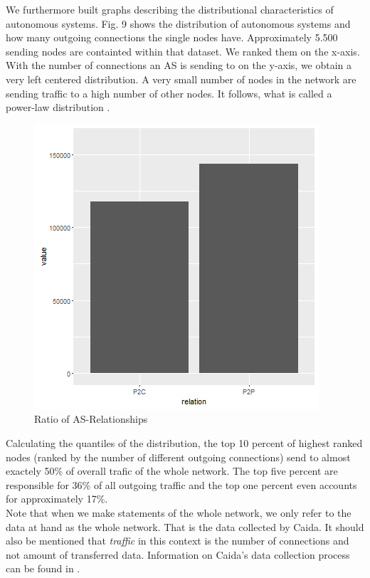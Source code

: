 \documentclass[conference, 11pt]{IEEEtran}
\begin{document}
We furthermore built graphs describing the distributional characteristics of autonomous systems. Fig. 9 shows the distribution of autonomous systems and how many outgoing connections the single nodes have. Approximately 5.500 sending nodes are containted within that dataset. We ranked them on the x-axis. With the number of connections an AS is sending to on the y-axis, we obtain a very left centered distribution. A very small number of nodes in the network are sending traffic to a high number of other nodes. It follows, what is called a power-law distribution  \cite{powerlawCitation}.

\vspace{0.5cm}
\begin{figure}[htbp]
\centerline{\includegraphics[scale=0.45]{Graphics/relationspeerandprovider.png}}
\caption{Ratio of AS-Relationships }
\label{fig}
\end{figure}
\vspace{0.5cm}

 Calculating the quantiles of the distribution, the top 10 percent of highest ranked nodes (ranked by the number of different outgoing connections) send to almost exactely 50\% of overall trafic of the whole network. The top five percent are responsible for 36\% of all outgoing traffic and the top one percent even accounts for approximately 17\%. \\ \linebreak Note that when we make statements of the whole network, we only refer to the data at hand as the whole network. That is the data collected by Caida. It should also be mentioned that \textit{traffic} in this context is the number of connections and not amount of transferred data. Information on Caida's data collection process can be found in \cite{CaidaDataCollection} . \\ \linebreak
\end{document}
